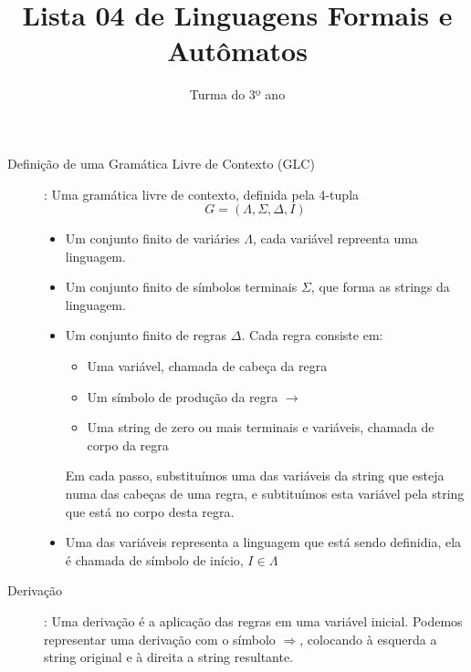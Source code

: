 \documentclass[12pt]{article}
\title{Lista 04 de Linguagens Formais e Autômatos}
\date{}
\author{Turma do 3º ano}
\begin{document}
 

\maketitle

\begin{description}

\item[Definição de uma Gramática Livre de Contexto (GLC)]: Uma gramática livre de contexto, definida pela 4-tupla
\[G = (\Lambda, \Sigma, \Delta, I)\]
\begin{itemize}
\item Um conjunto finito de variáries $\Lambda$, cada variável repreenta uma linguagem.
\item Um conjunto finito de símbolos terminais $\Sigma$, que forma as strings da linguagem.
\item Um conjunto finito de regras $\Delta$. Cada regra consiste em:
  \begin{itemize}
  \item Uma variável, chamada de cabeça da regra
  \item Um símbolo de produção da regra $\rightarrow$
  \item Uma string de zero ou mais terminais e variáveis, chamada de corpo da regra
  \end{itemize}
  Em cada passo, substituímos uma das variáveis da string que esteja numa das cabeças de uma regra, e subtituímos esta variável pela string que está no corpo desta regra.
\item Uma das variáveis representa a linguagem que está sendo definidia, ela é chamada de símbolo de início, $I\in \Lambda$
\end{itemize}

\item[Derivação]: Uma derivação é a aplicação das regras em uma variável inicial. Podemos representar uma derivação com o símbolo $\Rightarrow$, colocando à esquerda a string original e à direita a string resultante.

\end{description}

\vspace{3em}
\end{document}
